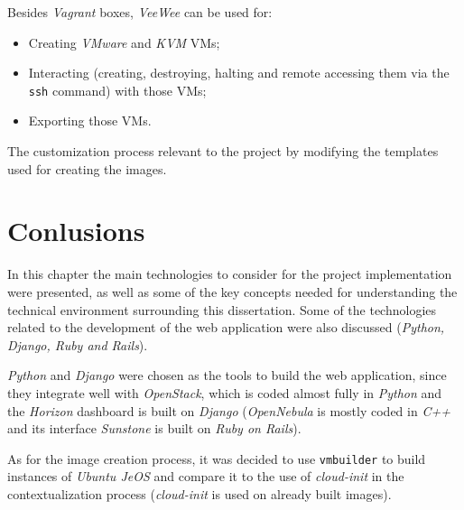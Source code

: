 Besides \textit{Vagrant} boxes, \textit{VeeWee} can be used for:

\begin{itemize}
\item Creating \textit{VMware} and \textit{KVM} VMs;
\item Interacting (creating, destroying, halting and remote accessing them via the \texttt{ssh} command) with those VMs;
\item Exporting those VMs.
\end{itemize}

The customization process relevant to the project by modifying the templates used for creating the images.

\section{Conlusions}\label{sota:concl}

In this chapter the main technologies to consider for the project implementation were presented, as well as some of the key concepts needed for understanding the technical environment surrounding this dissertation. Some of the technologies related to the development of the web application were also discussed (\textit{Python, Django, Ruby and Rails}).

\textit{Python} and \textit{Django} were chosen as the tools to build the web application, since they integrate well with \textit{OpenStack}, which is coded almost fully in \textit{Python} and the \textit{Horizon} dashboard is built on \textit{Django} (\textit{OpenNebula} is mostly coded in \textit{C++} and its interface \textit{Sunstone} is built on \textit{Ruby on Rails}).

As for the image creation process, it was decided to use \texttt{vmbuilder} to build instances of \textit{Ubuntu JeOS} and compare it to the use of \textit{cloud-init} in the contextualization process (\textit{cloud-init} is used on already built images).
